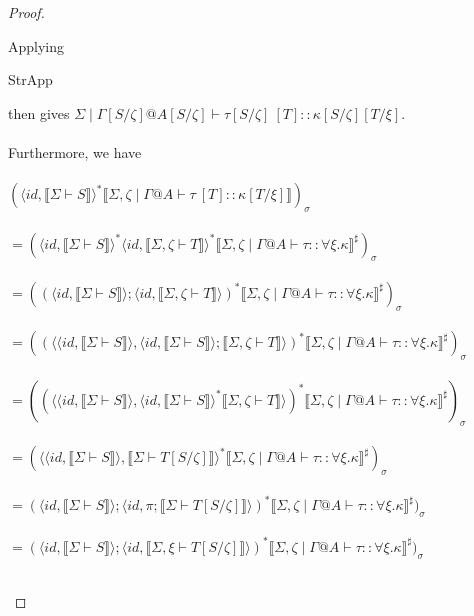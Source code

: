\documentclass{article}
\newcommand{\sem}[1]{\llbracket #1 \rrbracket}
\begin{document}
\begin{proof}
\begin{description}
Applying \begin{sc}StrApp\end{sc} then gives $\Sigma \mid \Gamma[S/\zeta] @ A[S/\zeta] \vdash \tau[S/\zeta]~[T] :: \kappa[S/\zeta][T/\xi]$.\\~\\
Furthermore, we have\\~\\
$(\langle \mathit{id}, \sem{\Sigma \vdash S} \rangle^* \sem{\Sigma,\zeta \mid \Gamma @ A \vdash \tau~[T] :: \kappa[T/\xi]})_\sigma$\\~\\
$= (\langle \mathit{id}, \sem{\Sigma \vdash S} \rangle^* \langle \mathit{id}, \sem{\Sigma,\zeta \vdash T} \rangle^* \sem{\Sigma,\zeta \mid \Gamma @ A \vdash \tau :: \forall \xi. \kappa}^\sharp)_\sigma$\\~\\
$= ((\langle \mathit{id}, \sem{\Sigma \vdash S} \rangle; \langle \mathit{id}, \sem{\Sigma,\zeta \vdash T} \rangle)^* \sem{\Sigma,\zeta \mid \Gamma @ A \vdash \tau :: \forall \xi. \kappa}^\sharp)_\sigma$\\~\\
$= ((\langle \langle \mathit{id}, \sem{\Sigma \vdash S} \rangle, \langle \mathit{id}, \sem{\Sigma \vdash S} \rangle;\sem{\Sigma,\zeta \vdash T} \rangle)^* \sem{\Sigma,\zeta \mid \Gamma @ A \vdash \tau :: \forall \xi. \kappa}^\sharp)_\sigma$\\~\\
$= ((\langle \langle \mathit{id}, \sem{\Sigma \vdash S} \rangle, \langle \mathit{id}, \sem{\Sigma \vdash S} \rangle^*\sem{\Sigma,\zeta \vdash T} \rangle)^* \sem{\Sigma,\zeta \mid \Gamma @ A \vdash \tau :: \forall \xi. \kappa}^\sharp)_\sigma$\\~\\
$= (\langle \langle \mathit{id}, \sem{\Sigma \vdash S} \rangle, \sem{\Sigma \vdash T[S/\zeta]} \rangle^* \sem{\Sigma,\zeta \mid \Gamma @ A \vdash \tau :: \forall \xi. \kappa}^\sharp)_\sigma$\\~\\
$= (\langle \mathit{id}, \sem{\Sigma \vdash S} \rangle;\langle \mathit{id}, \pi;\sem{\Sigma \vdash T[S/\zeta]} \rangle)^* \sem{\Sigma,\zeta \mid \Gamma @ A \vdash \tau :: \forall \xi. \kappa}^\sharp)_\sigma$\\~\\
$= (\langle \mathit{id}, \sem{\Sigma \vdash S} \rangle;\langle \mathit{id}, \sem{\Sigma,\xi \vdash T[S/\zeta]} \rangle)^* \sem{\Sigma,\zeta \mid \Gamma @ A \vdash \tau :: \forall \xi. \kappa}^\sharp)_\sigma$\\~\\

\end{description}
\end{proof}
\end{document}
